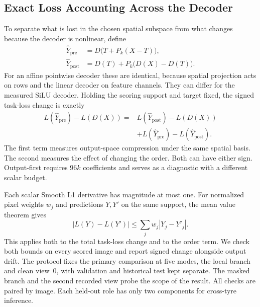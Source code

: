 \subsection{Exact Loss Accounting Across the Decoder}
To separate what is lost in the chosen spatial subspace from what changes because the decoder is nonlinear, define
\begin{align}
 \widehat Y_{\mathrm{pre}} &= D\big(T+P_k(X-T)\big),\\
 \widehat Y_{\mathrm{post}} &= D(T)+P_k\big(D(X)-D(T)\big).
\end{align}
For an affine pointwise decoder these are identical, because spatial projection acts on rows and the linear decoder on feature channels. They can differ for the measured SiLU decoder. Holding the scoring support and target fixed, the signed task-loss change is exactly
\begin{equation}
\begin{split}
 L(\widehat Y_{\mathrm{pre}})-L(D(X))
  ={}& L(\widehat Y_{\mathrm{post}})-L(D(X))\\
     &+L(\widehat Y_{\mathrm{pre}})-L(\widehat Y_{\mathrm{post}}).
\end{split}\label{eq:order}
\end{equation}
The first term measures output-space compression under the same spatial basis. The second measures the effect of changing the order. Both can have either sign. Output-first requires $96k$ coefficients and serves as a diagnostic with a different scalar budget.

Each scalar Smooth L1 derivative has magnitude at most one. For normalized pixel weights $w_j$ and predictions $Y,Y'$ on the same support, the mean value theorem gives
\begin{equation}
 \left|L(Y)-L(Y')\right|\leq\sum_j w_j|Y_j-Y'_j|.
\end{equation}
This applies both to the total task-loss change and to the order term. We check both bounds on every scored image and report signed change alongside output drift. The protocol fixes the primary comparison at five modes, the local branch and clean view~0, with validation and historical test kept separate. The masked branch and the second recorded view probe the scope of the result. All checks are paired by image. Each held-out role has only two components for cross-tyre inference.

